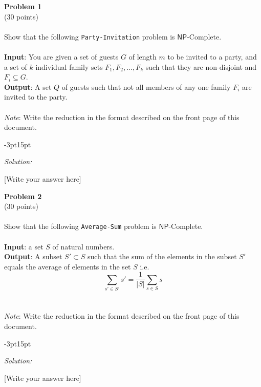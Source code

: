 \documentclass[12pt]{article}
\newcommand{\NP}{\mathsf{NP}}
\newenvironment{solution}{
\vspace{2pt}
\begin{adjustwidth}{-3pt}{15pt}
\begin{mdframed}
\textit{Solution:} \vspace{4pt}
}{
\end{mdframed}
\end{adjustwidth}
}
\begin{document}
\textbf{\large Problem 1}\\ {(30 points)} \\\\ 
Show that the following \texttt{Party-Invitation} problem is $\NP$-Complete. \\\\
\textbf{Input}: You are given a set of guests $G$ of length $m$ to be invited to a party, and a set of $k$ individual family sets $F_1, F_2, ..., F_k$ such that they are non-disjoint and $F_i \subseteq G$.\\
\textbf{Output}: A set $Q$ of guests such that not all members of any one family $F_i$ are invited to the party.\\\\
\textit{Note}: Write the reduction in the format described on the front page of this document. \\

\begin{solution}
    [Write your answer here] \vspace{12pt} %
\end{solution}
\newpage

\textbf{\large Problem 2}\\ {(30 points)} \\\\ 
Show that the following \texttt{Average-Sum} problem is $\NP$-Complete. \\\\
\textbf{Input}: a set $S$ of natural numbers.\\
\textbf{Output}: A subset $S' \subset S$ such that the sum of the elements in the subset $S'$ equals the average of elements in the set $S$ i.e.
 \[ \sum_{s' \in S'} s' = \frac{1}{|S|} \sum_{s \in S} s \]
\\\\  
\textit{Note}: Write the reduction in the format described on the front page of this document. \\

\begin{solution}
    [Write your answer here] \vspace{12pt} %
\end{solution}
\newpage
\end{document}

